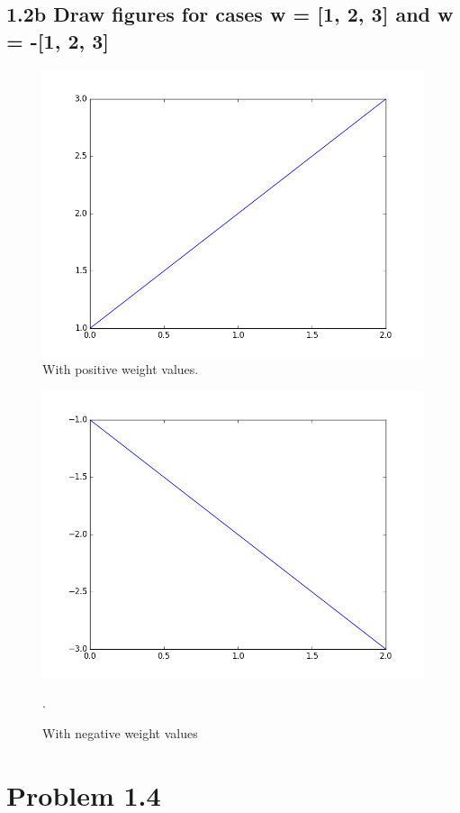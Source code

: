 \documentclass[11pt]{article}
\begin{document}
\subsection*{1.2b Draw figures for cases w = [1, 2, 3] and w = -[1, 2, 3]}
\begin{figure}
	\includegraphics{12bpos.png}
	\caption{With positive weight values.}
\end{figure}

\begin{figure}
	\includegraphics{12bneg.png}
	\caption{With negative weight values}.
\end{figure}
\newpage

\section*{Problem 1.4}
\end{document}
